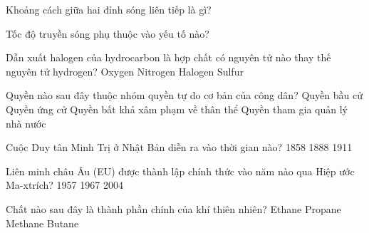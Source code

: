 \begin{ex}
    \begin{chc}
        Khoảng cách giữa hai đỉnh sóng liên tiếp là gì?
    
    \end{chc}
    \begin{chc}
        Tốc độ truyền sóng phụ thuộc vào yếu tố nào?
    \end{chc}
\end{ex}
\begin{ex}
    Dẫn xuất halogen của hydrocarbon là hợp chất có nguyên tử nào thay thế nguyên tử hydrogen?
    \choice
    {Oxygen}
    {Nitrogen}
    {\True Halogen}
    {Sulfur}

\end{ex}
\begin{ex}
    Quyền nào sau đây thuộc nhóm quyền tự do cơ bản của công dân?
    \choice
    {Quyền bầu cử}
    {Quyền ứng cử}
    {\True Quyền bất khả xâm phạm về thân thể}
    {Quyền tham gia quản lý nhà nước}

\end{ex}
\begin{ex}
    Cuộc Duy tân Minh Trị ở Nhật Bản diễn ra vào thời gian nào?
    \choice
    {1858}
    {}
    {1888}
    {1911}

\end{ex}
\begin{ex}
    Liên minh châu Âu (EU) được thành lập chính thức vào năm nào qua Hiệp ước Ma-xtrích?
    \choice
    {1957}
    {1967}
    {}
    {2004}

\end{ex}
\begin{ex}
    Chất nào sau đây là thành phần chính của khí thiên nhiên?
    \choice
    {Ethane}
    {Propane}
    {\True Methane}
    {Butane}

\end{ex}
